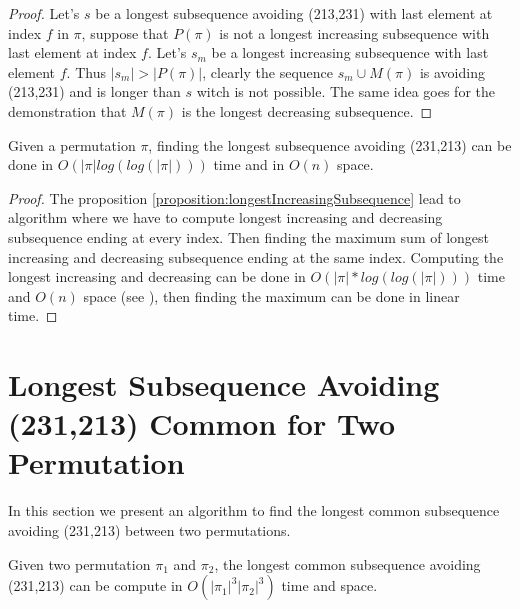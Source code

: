 \documentclass[a4paper]{llncs}
\newcommand{\ptext}{\pi}
\newcounter{num}
\begin{document}
	\begin{proof}
	Let's $s$ be a longest subsequence avoiding (213,231) with last element at index $f$ in $\pi$,
	suppose that $P(\pi)$ is not a longest increasing subsequence with last element at index $f$. Let's $s_m$ be a longest increasing subsequence with last element $f$.
	Thus $|s_m|>|P(\pi)|$, clearly the sequence $s_m \cup M(\pi)$
	is avoiding (213,231) and is longer than $s$ witch is not possible.
	The same idea goes for the demonstration that $M(\pi)$ is the longest decreasing subsequence.
	\end{proof}

	\begin{proposition}
	Given a permutation $\pi$,
	finding the longest subsequence avoiding (231,213)
	can be done in $O(|\ptext|log(log(|\ptext|)))$ time and in $O(n)$ space.
	\end{proposition}

	\begin{proof}
	The proposition \ref{proposition:longestIncreasingSubsequence} lead to algorithm
	where we have to compute longest increasing and decreasing subsequence ending at every index. Then finding the maximum sum of longest increasing and decreasing subsequence ending at the same index.
	Computing the longest increasing and decreasing can be done in $O(|\ptext|*log(log(|\ptext|)))$ time and $O(n)$ space (see \cite{Bespamyatnikh00enumeratinglongest}), then finding the maximum can be done in linear time.
	\end{proof}


\section{Longest Subsequence Avoiding \\(231,213) Common for Two Permutation}

In this section we present an algorithm to find
the longest common subsequence avoiding (231,213)
between two permutations.\\

\begin{proposition}
Given two permutation $\pi_1$ and $\pi_2$,
the longest common subsequence
avoiding (231,213) can be compute in $O(|\pi_1|^3|\pi_2|^3)$ time and space.
\end{proposition}
\end{document}
